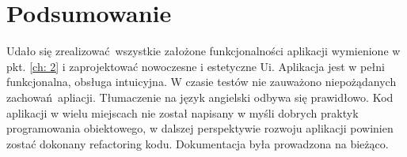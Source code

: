 \section{Podsumowanie}
    Udało się zrealizować wszystkie założone funkcjonalności aplikacji wymienione w pkt. \ref{ch: 2} i zaprojektować 
    nowoczesne i estetyczne Ui. Aplikacja jest w pełni funkcjonalna, obsługa intuicyjna. W czasie testów nie zauważono 
    niepożądanych zachowań apliacji. Tłumaczenie na język  angielski odbywa się prawidłowo.
    Kod aplikacji w wielu miejscach nie został napisany w myśli dobrych praktyk programowania obiektowego, w dalszej 
    perspektywie rozwoju aplikacji powinien zostać dokonany refactoring kodu. Dokumentacja była prowadzona na bieżąco. 
